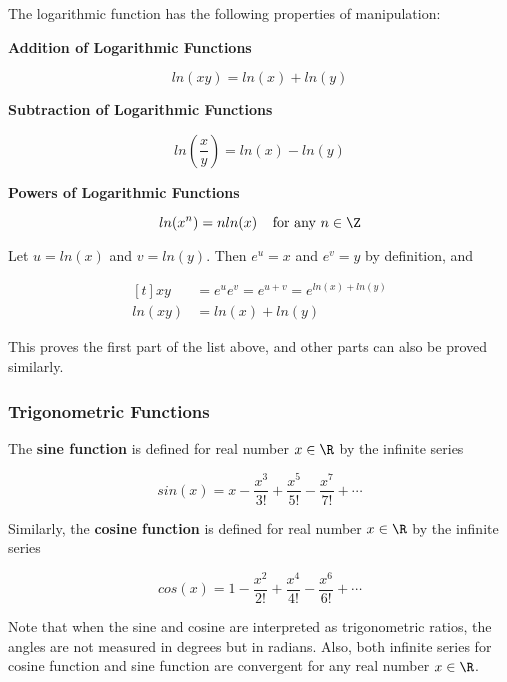 \begin{thm}
  The logarithmic function has the following properties of manipulation:

  \begin{alist}
    \item \textbf{Addition of Logarithmic Functions}

    $$ln(xy)=ln(x)+ln(y)$$

    \item \textbf{Subtraction of Logarithmic Functions}

    $$ln\left(\frac{x}{y}\right)=ln(x)-ln(y)$$

    \item \textbf{Powers of Logarithmic Functions}

    $$ln(x^{n})=nln(x)\;\;\;\;\text{for any }n\in \Z$$
  \end{alist}

  \prf Let $u=ln(x)$ and $v=ln(y)$. Then $e^{u}=x$ and $e^{v}=y$ by definition, and

  $$\begin{aligned}[t]
    xy&=e^{u}e^{v}=e^{u+v}=e^{ln(x)+ln(y)}\\
    ln(xy)&=ln(x)+ln(y)
  \end{aligned}$$\s

  This proves the first part of the list above, and other parts can also be proved similarly.
\end{thm}

\subsubsection{Trigonometric Functions}
\begin{dft}
  The \textbf{sine function} is defined for real number $x\in \R$ by the infinite series

  $$sin(x)=x-\frac{x^{3}}{3!}+\frac{x^{5}}{5!}-\frac{x^{7}}{7!}+\cdots$$\s

  Similarly, the \textbf{cosine function} is defined for real number $x\in \R$ by the infinite series

  $$cos(x)=1-\frac{x^{2}}{2!}+\frac{x^{4}}{4!}-\frac{x^{6}}{6!}+\cdots$$
\end{dft}\n

Note that when the sine and cosine are interpreted as trigonometric ratios, the angles are not measured in degrees but in radians. Also, both infinite series for cosine function and sine function are convergent for any real number $x\in \R$.\n

